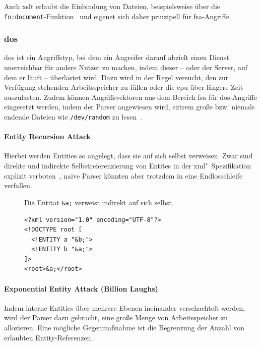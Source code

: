 Auch \acrfull{xslt} erlaubt die Einbindung von Dateien, beispielsweise über die \texttt{fn:document}-Funktion~\cite[Abschn. 20.1]{xslt} und eigenet sich daher prinzipell für \acrshort{fsa}-Angriffe.

\subsubsection{\acrfull{dos}}
\label{sec:xmlattacks-dos}

\acrlong{dos} ist ein Angriffstyp, bei dem ein Angreifer darauf abzielt einen Dienst unerreichbar für andere Nutzer zu machen, indem dieser -- oder der Server, auf dem er läuft -- überlastet wird. Dazu wird in der Regel versucht, den zur Verfügung stehenden Arbeitsspeicher zu füllen oder die \acrshort{cpu} über längere Zeit auszulasten. Zudem können Angriffsvektoren aus dem Bereich \acrlong{fsa} für \acrshort{dos}-Angriffe eingesetzt werden, indem der Parser angewiesen wird, extrem große bzw. niemals endende Dateien wie \texttt{/dev/random} zu lesen~\cite[S.~13]{morgan2014xml}.

\paragraph{Entity Recursion Attack}
Hierbei werden Entities so angelegt, dass sie auf sich selbst verweisen. Zwar sind direkte und indirekte Selbstreferenzierung von Entites in der \acrshort{xml}"~Spezifikation explizit verboten~\cite[Abschnitt 4.1]{xml}, naive Parser könnten aber trotzdem in eine Endlosschleife verfallen.

\begin{figure}[h!]
\begin{example} Die Entität \texttt{&a;} verweist indirekt auf sich selbst.
    \begin{verbatim}
<?xml version="1.0" encoding="UTF-8"?>
<!DOCTYPE root [
  <!ENTITY a "&b;">
  <!ENTITY b "&a;">
]>
<root>&a;</root>
    \end{verbatim}
\end{example}
\end{figure}

\paragraph{Exponential Entity Attack (Billion Laughs)}
Indem interne Entities über mehrere Ebenen ineinander verschachtelt werden, wird der Parser dazu gebracht, eine große Menge von Arbeitsspeicher zu allozieren. Eine mögliche Gegenmaßnahme ist die Begrenzung der Anzahl von erlaubten Entity-Referenzen.

